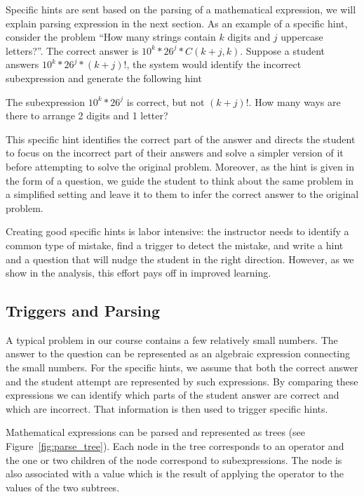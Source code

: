 \documentclass{llncs2e/llncs}
\begin{document}
Specific hints are sent based on the parsing of a mathematical expression, we will explain parsing expression in the next section. As an example of a specific hint, consider the problem ``How many strings contain $k$ digits and $j$ uppercase letters?''. The correct answer is $10^k*26^j*C(k+j,k)$. Suppose a student answers $10^k*26^j*(k+j)!$, the system would identify the incorrect subexpression and generate the following hint

\begin{displayquote}
The subexpression $10^k*26^j$ is correct, but not $(k+j)!$. How many
ways are there to arrange 2 digits and 1 letter? 
\end{displayquote}

This specific hint identifies the correct part of the answer and
directs the student to focus on the incorrect part of their answers and solve a simpler version of it before attempting to solve the original problem. Moreover, as the hint is given in the form of a question, we guide the student to think about the same problem in a simplified setting and leave it to them to infer the correct answer to the original problem. 

Creating good specific hints is labor intensive: the instructor needs to identify a common type of mistake, find a trigger to detect the mistake, and write a hint and a question that will nudge the student in the right direction. However, as we show in the analysis, this effort pays off in improved learning.

\subsection*{Triggers and Parsing}

A typical problem in our course contains a few relatively small numbers. The answer to the question can be represented as an algebraic expression connecting the small numbers. For the specific hints, we assume that both the correct answer and the student attempt are represented by such expressions. By comparing these expressions we can identify which
parts of the student answer are correct and which are incorrect. That information is then used to trigger specific hints.

Mathematical expressions can be parsed and represented as trees (see Figure~\ref{fig:parse_tree}). Each node in the tree corresponds to an operator and the one or two children of the node correspond to subexpressions. The node is also associated with a value which is the result of applying the operator to the values of the two subtrees.
\end{document}
